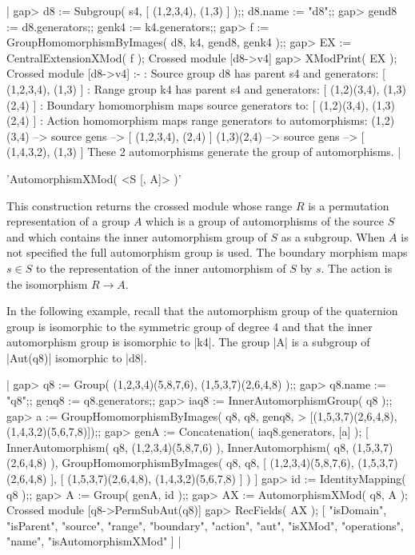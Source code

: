 |    gap> d8 := Subgroup( s4, [ (1,2,3,4), (1,3) ] );; d8.name := "d8";;
    gap> gend8 := d8.generators;; genk4 := k4.generators;;
    gap> f := GroupHomomorphismByImages( d8, k4, gend8, genk4 );;
    gap> EX := CentralExtensionXMod( f );
    Crossed module [d8->v4] 
    gap> XModPrint( EX );
    Crossed module [d8->v4] :-
    : Source group d8 has parent s4 and generators:
      [ (1,2,3,4), (1,3) ]
    : Range group k4 has parent s4 and generators:
      [ (1,2)(3,4), (1,3)(2,4) ]
    : Boundary homomorphism maps source generators to:
      [ (1,2)(3,4), (1,3)(2,4) ]
    : Action homomorphism maps range generators to automorphisms:
      (1,2)(3,4) --> { source gens --> [ (1,2,3,4), (2,4) ] }
      (1,3)(2,4) --> { source gens --> [ (1,4,3,2), (1,3) ] }
    These 2 automorphisms generate the group of automorphisms.   |

%

'AutomorphismXMod( <S [, A]> )'

This construction  returns the  crossed module  whose  range $R$ is  a
permutation  representation  of a  group   $A$ which  is  a  group  of
automorphisms of  the    source $S$ and    which  contains the   inner
automorphism group  of $S$ as a subgroup.   When $A$ is  not specified
the full automorphism group is  used.   The boundary morphism maps  $s
\in S$ to the representation of the  inner automorphism of $S$ by $s$.
The action is the isomorphism $R \to A$.

In  the following example, recall  that the automorphism  group of the
quaternion group is isomorphic to the symmetric  group of degree 4 and
that  the inner automorphism group  is isomorphic  to |k4|.  The group
|A| is a subgroup of |Aut(q8)| isomorphic to |d8|.

|    gap> q8 := Group( (1,2,3,4)(5,8,7,6), (1,5,3,7)(2,6,4,8) );;
    gap> q8.name := "q8";; genq8 := q8.generators;;
    gap> iaq8 := InnerAutomorphismGroup( q8 );;
    gap> a := GroupHomomorphismByImages( q8, q8, genq8,
    >             [(1,5,3,7)(2,6,4,8),(1,4,3,2)(5,6,7,8)]);;
    gap> genA := Concatenation( iaq8.generators, [a] );
    [ InnerAutomorphism( q8, (1,2,3,4)(5,8,7,6) ), 
      InnerAutomorphism( q8, (1,5,3,7)(2,6,4,8) ), 
      GroupHomomorphismByImages( q8, q8, [ (1,2,3,4)(5,8,7,6),
       (1,5,3,7)(2,6,4,8) ], [ (1,5,3,7)(2,6,4,8), (1,4,3,2)(5,6,7,8) ] ) ]
    gap> id := IdentityMapping( q8 );;
    gap> A := Group( genA, id );;
    gap> AX := AutomorphismXMod( q8, A );
    Crossed module [q8->PermSubAut(q8)] 
    gap> RecFields( AX );
    [ "isDomain", "isParent", "source", "range", "boundary", "action",
      "aut", "isXMod", "operations", "name", "isAutomorphismXMod" ]       |

